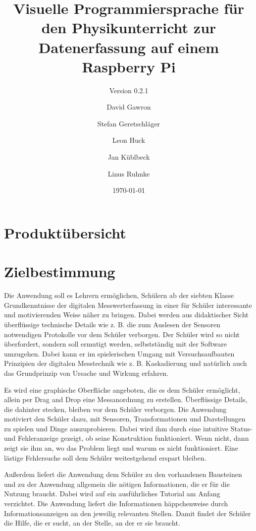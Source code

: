 \documentclass[parskip=full]{scrartcl}
\title{Visuelle Programmiersprache für den Physikunterricht zur Datenerfassung auf einem Raspberry Pi}
\subtitle{Version 0.2.1}
\author{David Gawron \and Stefan Geretschläger \and Leon Huck \and Jan Küblbeck \and Linus Ruhnke}
\date{\today}
\begin{document}
\maketitle

\newpage
\tableofcontents 					%
\newpage

\section{Produktübersicht}



\section{Zielbestimmung}

Die Anwendung soll es Lehrern ermöglichen, Schülern ab der siebten Klasse Grundkenntnisse der digitalen Messwerterfassung in einer für Schüler interessante und motivierenden Weise näher zu bringen. 
Dabei werden aus didaktischer Sicht überflüssige technische Details wie z. B. die zum Auslesen der Sensoren notwendigen Protokolle vor dem Schüler verborgen.
Der Schüler wird so nicht überfordert, sondern soll ermutigt werden, selbstständig mit der Software umzugehen. 
Dabei kann er im spielerischen Umgang mit Versuchsaufbauten Prinzipien der digitalen Messtechnik wie z. B. Kaskadierung und natürlich auch das Grundprinzip von Ursache und Wirkung erfahren.

Es wird eine graphische Oberfläche angeboten, die es dem Schüler ermöglicht, allein per Drag and Drop eine Messanordnung zu erstellen. 
Überflüssige Details, die dahinter stecken, bleiben vor dem Schüler verborgen.
Die Anwendung motiviert den Schüler dazu, mit Sensoren, Transformationen und Darstellungen zu spielen und Dinge auszuprobieren. 
Dabei wird ihm durch eine intuitive Status- und Fehleranzeige gezeigt, ob seine Konstruktion funktioniert. 
Wenn nicht, dann zeigt sie ihm an, wo das Problem liegt und warum es nicht funktioniert. 
Eine lästige Fehlersuche soll dem Schüler weitestgehend erspart bleiben. 

Außerdem liefert die Anwendung dem Schüler zu den vorhandenen Bausteinen und zu der Anwendung allgemein die nötigen Informationen, die er für die Nutzung braucht. Dabei wird auf ein ausführliches Tutorial am Anfang verzichtet. Die Anwendung liefert die Informationen häppchenweise durch Informationsanzeigen an den jeweilig relevanten Stellen. Damit findet der Schüler die Hilfe, die er sucht, an der Stelle, an der er sie braucht.
\end{document}
